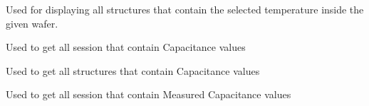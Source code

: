 \documentclass[letterpaper,10pt,english]{sphinxmanual}
\begin{document}

\begin{fulllineitems}
\label{\detokenize{app:app.filter_by_Temps}}
\pysigstartsignatures
{}
\pysigstopsignatures
\sphinxAtStartPar
Used for displaying all structures that contain the selected temperature inside the given wafer.

\end{fulllineitems}


\begin{fulllineitems}
\label{\detokenize{app:app.getCSess}}
\pysigstartsignatures
{}
\pysigstopsignatures
\sphinxAtStartPar
Used to get all session that contain Capacitance values

\end{fulllineitems}


\begin{fulllineitems}
\label{\detokenize{app:app.getCStruct}}
\pysigstartsignatures
{}
\pysigstopsignatures
\sphinxAtStartPar
Used to get all structures that contain Capacitance values

\end{fulllineitems}


\begin{fulllineitems}
\label{\detokenize{app:app.getCmesSess}}
\pysigstartsignatures
{}
\pysigstopsignatures
\sphinxAtStartPar
Used to get all session that contain Measured Capacitance values

\end{fulllineitems}
\end{document}
